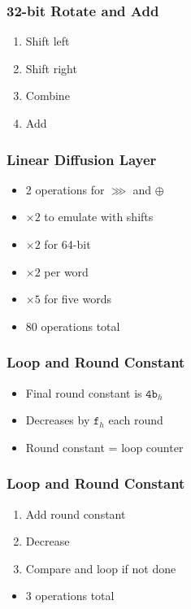 \documentclass[17pt]{beamer}
\newcommand{\hex}[1]{$\mathtt{#1}_h$}
\newcommand{\xor}[0]{\oplus}
\newcommand{\ror}[0]{\ggg}
\begin{document}
\begin{frame}
    \frametitle{32-bit Rotate and Add}
    \begin{enumerate}
        \item Shift left
        \item Shift right
        \item Combine
        \item Add
    \end{enumerate}
\end{frame}

\begin{frame}
    \frametitle{Linear Diffusion Layer}
    \begin{itemize}
        \item 2 operations for $\ror$ and $\xor$
        \item $\times 2$ to emulate with shifts
        \item $\times 2$ for 64-bit
        \item $\times 2$ per word
        \item $\times 5$ for five words
        \item 80 operations total
    \end{itemize}
\end{frame}

\begin{frame}
    \frametitle{Loop and Round Constant}
    \begin{itemize}
        \item Final round constant is \hex{4b}
        \item Decreases by \hex{f} each round
        \item Round constant = loop counter
    \end{itemize}
\end{frame}

\begin{frame}
    \frametitle{Loop and Round Constant}
    \begin{enumerate}
        \item Add round constant
        \item Decrease
        \item Compare and loop if not done
    \end{enumerate}
    \vfill
    \begin{itemize}
        \item 3 operations total
    \end{itemize}
\end{frame}
\end{document}
